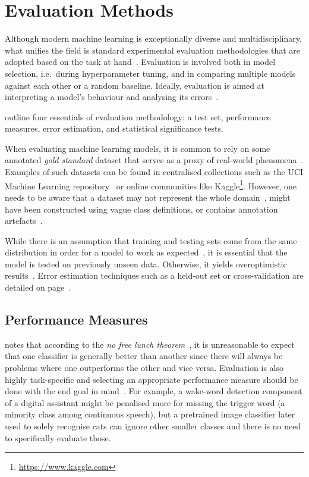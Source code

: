 \chapter{Evaluation Methods}
\label{ch:evaluation-methods}

Although modern machine learning is exceptionally diverse and multidisciplinary, what unifies the field is standard experimental evaluation methodologies that are adopted based on the task at hand~\citep{Kibler1988}.
%
Evaluation is involved both in model selection, i.e.\ during hyperparameter tuning, and in comparing multiple models against each other or a random baseline.
Ideally, evaluation is aimed at interpreting a model's behaviour and analysing its errors~\citep{Doshi2017}.

\citet{Japkowic2011} outline four essentials of evaluation methodology: a test set, performance measures, error estimation, and statistical significance tests.

When evaluating machine learning models, it is common to rely on some annotated \emph{gold standard} dataset that serves as a proxy of real-world phenomena~\citep{Manning2008}.
%
Examples of such datasets can be found in centralised collections such as the UCI Machine Learning repository~\citep{Dua2017} or online communities like Kaggle\footnote{\url{https://www.kaggle.com}}.
However, one needs to be aware that a dataset
may not represent the whole domain~\citep{Japkowic2011},
might have been constructed using vague class definitions,
or contains annotation artefacts~\citep{Hand2006}.

While there is an assumption that training and testing sets come from the same distribution in order for a model to work as expected~\citep{Japkowic2011}, it is essential that the model is tested on previously unseen data.
Otherwise, it yields overoptimistic results~\citep{Kibler1988}.
%
Error estimation techniques such as a held-out set or cross-validation are detailed
on page~\pageref{ch:cross-validation}.

\section{Performance Measures}
\citet{Stapor17} notes that according to the \emph{no free lunch theorem}~\citep{Wolpert1996}, it is unreasonable to expect that one classifier is generally better than another since there will always be problems where one outperforms the other and vice versa.
Evaluation is also highly task-specific and selecting an appropriate performance measure should be done with the end goal in mind~\citep{goodfellow2016deeplearning}. For example, a wake-word detection component of a digital assistant might be penalised more for missing the trigger word (a minority class among continuous speech), but a pretrained image classifier later used to solely recognise cats can ignore other smaller classes and there is no need to specifically evaluate those.

